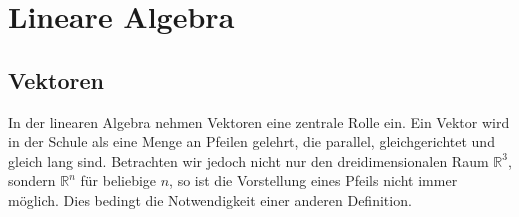 


%

\section{Lineare Algebra}
\subsection{Vektoren}
In der linearen Algebra nehmen Vektoren eine zentrale Rolle ein. Ein Vektor wird in der Schule als eine Menge an Pfeilen gelehrt, die parallel, gleichgerichtet und gleich lang sind. Betrachten wir jedoch nicht nur den dreidimensionalen Raum $\mathbb{R}^3$, sondern $\mathbb{R}^n$ f\"ur beliebige $n$, so ist die Vorstellung eines Pfeils nicht immer m\"oglich. Dies bedingt die Notwendigkeit einer anderen Definition.

